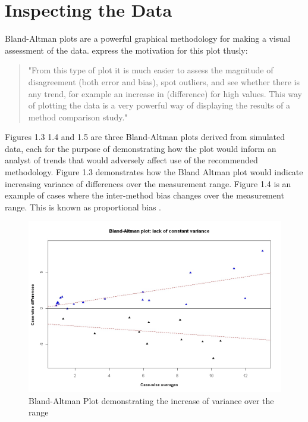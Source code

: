 \documentclass[12pt, a4paper]{report}
\theoremstyle{plain}
\theoremstyle{definition}
\theoremstyle{remark}
\begin{document}
	
	\newpage
	
	
	
	\section{Inspecting the Data}
	Bland-Altman plots are a powerful graphical methodology for making
	a visual assessment of the data. \citet*{BA83} express the
	motivation for this plot thusly:
	\begin{quote}
		"From this type of plot it is much easier to assess the magnitude
		of disagreement (both error and bias), spot outliers, and see
		whether there is any trend, for example an increase in
		(difference) for high values. This way of plotting the data is a
		very powerful way of displaying the results of a method comparison
		study."
	\end{quote}
	
	
	Figures 1.3 1.4 and 1.5 are three Bland-Altman plots derived from
	simulated data, each for the purpose of demonstrating how the plot
	would inform an analyst of trends that would adversely affect use
	of the recommended methodology. Figure 1.3 demonstrates how the
	Bland Altman plot would indicate increasing variance of
	differences over the measurement range. Figure 1.4 is an example
	of cases where the inter-method bias changes over the measurement
	range. This is known as proportional bias \citep{ludbrook97}.
	
	
	\begin{figure}[h!]
		\begin{center}
			\includegraphics[width=125mm]{images/BAFanEffect.jpeg}
			\caption{Bland-Altman Plot demonstrating the increase of variance over the range}\label{BAFanEffect}
		\end{center}
	\end{figure}
	
\end{document}
